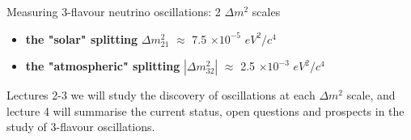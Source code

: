 \begin{frame}{Measuring 3-flavour neutrino oscillations: 2 $\Delta m^2$ scales}
\begin{itemize}
    \item {\color{red} \bf the "solar" splitting}
          {\bf ${\Delta}m^{2}_{21}$ }   $\approx$ 7.5 $\times 10^{-5}$ $eV^{2}/c^{4}$\\
    \vspace{0.1cm}
    \item {\color{red} \bf the "atmospheric" splitting}
          {\bf $|{\Delta}m^{2}_{32}|$ } $\approx$ 2.5 $\times 10^{-3}$ $eV^{2}/c^{4}$\\
\end{itemize}

\vspace{-0.1cm}

\begin{block}{}
{\scriptsize
 Lectures 2-3 we will study the discovery of oscillations
 at each $\Delta m^2$ scale, and lecture 4 will summarise the current status,
 open questions and prospects in the study of 3-flavour oscillations.\\
}
\end{block}

\end{frame}

%
%
%

